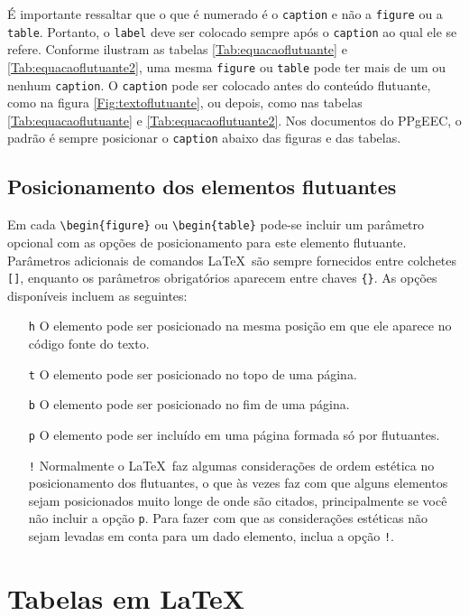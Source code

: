 É importante ressaltar que o que é numerado é o \texttt{caption} e não
a \texttt{figure} ou a \texttt{table}. Portanto, o \texttt{label} deve
ser colocado sempre após o \texttt{caption} ao qual ele se
refere. Conforme ilustram as tabelas \ref{Tab:equacaoflutuante} e
\ref{Tab:equacaoflutuante2}, uma mesma \texttt{figure} ou
\texttt{table} pode ter mais de um ou nenhum \texttt{caption}.
O \texttt{caption} pode ser colocado antes do conteúdo flutuante, como
na figura \ref{Fig:textoflutuante}, ou depois, como nas tabelas
\ref{Tab:equacaoflutuante} e \ref{Tab:equacaoflutuante2}. Nos
documentos do PPgEEC, o padrão é sempre posicionar o \texttt{caption}
abaixo das figuras e das tabelas.

\subsection{Posicionamento dos elementos flutuantes}
\label{Sec:posicionamento}

Em cada \verb|\begin{figure}| ou \verb|\begin{table}| pode-se incluir
um parâmetro opcional com as opções de posicionamento para este
elemento flutuante. Parâmetros adicionais de comandos \LaTeX\ são
sempre fornecidos entre colchetes \texttt{[]}, enquanto os parâmetros
obrigatórios aparecem entre chaves \verb|{}|. As opções disponíveis
incluem as seguintes:
\begin{itemize}
\item[\tt h] O elemento pode ser posicionado na mesma posição em que ele
aparece no código fonte do texto.
\item[\tt t] O elemento pode ser posicionado no topo de uma página.
\item[\tt b] O elemento pode ser posicionado no fim de uma página.
\item[\tt p] O elemento pode ser incluído em uma página formada só por
flutuantes.
\item[\tt !] Normalmente o \LaTeX\ faz algumas considerações de ordem
estética no posicionamento dos flutuantes, o que às vezes faz com que
alguns elementos sejam posicionados muito longe de onde são citados,
principalmente se você não incluir a opção \texttt{p}. Para fazer com
que as considerações estéticas não sejam levadas em conta para um dado
elemento, inclua a opção \texttt{!}.
\end{itemize}

\section{Tabelas em \LaTeX}
\label{Sec:tabelas}

